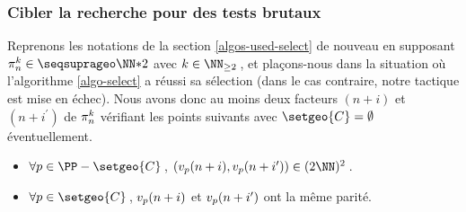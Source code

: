 \subsubsection{Cibler la recherche pour des tests brutaux} \label{algos-used-kill}

\leavevmode
\smallskip

Reprenons les notations de la section \ref{algos-used-select} de nouveau en supposant $\consprod \in \NNssquare$ avec $k \in \NN_{\geq 2}$\,, et plaçons-nous dans la situation où l'algorithme \ref{algo-select} a réussi sa sélection (dans le cas contraire, notre tactique est mise en échec).
Nous avons donc au moins deux facteurs $(n+i)$ et $(n+i^\prime)$ de $\consprod$ vérifiant les points suivants avec $\setgeo{C} = \emptyset$ éventuellement.
%
\begin{itemize}
	\item $\forall p \in \PP - \setgeo{C}$\,, $( \padicval{n+i}, \padicval{n+i^\prime} ) \in ( 2 \NN )^2$\,.

	\item $\forall p \in \setgeo{C}$\,, $\padicval{n+i}$ et $\padicval{n+i^\prime}$ ont la même parité.
\end{itemize}

